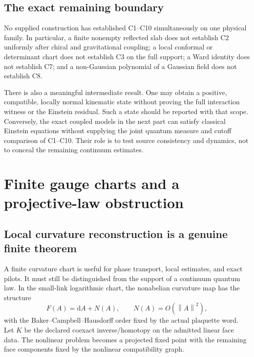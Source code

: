 \documentclass[11pt,a4paper,oneside]{book}
\theoremstyle{plain}
\theoremstyle{definition}
\theoremstyle{remark}
\newcommand{\dd}{\mathrm d}
\newcommand{\norm}[1]{\left\lVert#1\right\rVert}
\begin{document}
\section{The exact remaining boundary}
No supplied construction has established C1--C10 simultaneously on one physical family. In particular, a finite nonempty reflected slab does not establish C2 uniformly after chiral and gravitational coupling; a local conformal or determinant chart does not establish C3 on the full support; a Ward identity does not establish C7; and a non-Gaussian polynomial of a Gaussian field does not establish C8.

There is also a meaningful intermediate result. One may obtain a positive, compatible, locally normal kinematic state without proving the full interaction witness or the Einstein residual. Such a state should be reported with that scope. Conversely, the exact coupled models in the next part can satisfy classical Einstein equations without supplying the joint quantum measure and cutoff comparison of C1--C10. Their role is to test source consistency and dynamics, not to conceal the remaining continuum estimates.


\chapter{Finite gauge charts and a projective-law obstruction}
\label{ch:gauge-charts}
\section{Local curvature reconstruction is a genuine finite theorem}
A finite curvature chart is useful for phase transport, local estimates, and exact pilots. It must still be distinguished from the support of a continuum quantum law. In the small-link logarithmic chart, the nonabelian curvature map has the structure
\begin{equation}
 F(A)=\dd A+N(A),\qquad N(A)=O(\norm A^2),
 \label{eq:curvature-chart}
\end{equation}
with the Baker--Campbell--Hausdorff order fixed by the actual plaquette word. Let $K$ be the declared coexact inverse/homotopy on the admitted linear face data. The nonlinear problem becomes a projected fixed point with the remaining face components fixed by the nonlinear compatibility graph.
\end{document}
